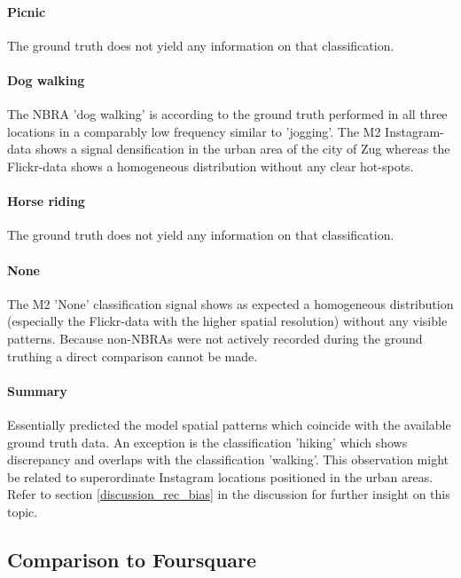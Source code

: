 \paragraph*{Picnic}
The ground truth does not yield any information on that classification.

\paragraph*{Dog walking}
The NBRA 'dog walking' is according to the ground truth performed in all three locations in a comparably low frequency similar to 'jogging'. The M2 Instagram-data shows a signal densification in the urban area of the city of Zug whereas the Flickr-data shows a homogeneous distribution without any clear hot-spots.

\paragraph*{Horse riding}
The ground truth does not yield any information on that classification.

\paragraph*{None} The M2 'None' classification signal shows as expected a homogeneous distribution (especially the Flickr-data with the higher spatial resolution) without any visible patterns. Because non-NBRAs were not actively recorded during the ground truthing a direct comparison cannot be made.

\paragraph*{Summary}
Essentially predicted the model spatial patterns which coincide with the available ground truth data. An exception is the classification 'hiking' which shows discrepancy and overlaps with the classification 'walking'.  This observation might be related to superordinate Instagram locations positioned in the urban areas. Refer to section \ref{discussion_rec_bias} in the discussion for further insight on this topic. 


\subsection{Comparison to Foursquare}

